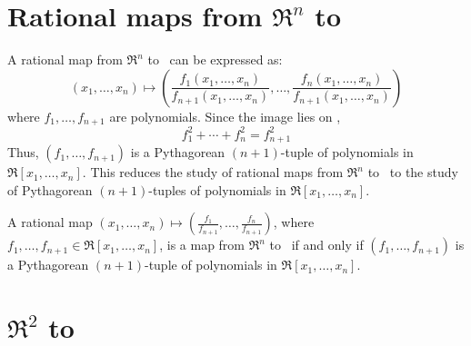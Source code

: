 \section{Rational maps from $\Re^{n}$ to }
\label{sec:setup}


A rational map from $\Re^n$ to \ can be expressed as:
\[
	(x_1,\ldots,x_n) \mapsto
	(\frac{f_1(x_1,\ldots,x_n)}{f_{n+1}(x_1,\ldots,x_n)}, \ldots,
	 \frac{f_n(x_1,\ldots,x_n)}{f_{n+1}(x_1,\ldots,x_n)})
\]
where $f_1,\ldots,f_{n+1}$ are polynomials.
Since the image lies on ,
\[
	f_1^2 + \cdots + f_n^2 = f_{n+1}^2
\]
Thus, $(f_1,\ldots,f_{n+1})$ is a Pythagorean $(n+1)$-tuple of polynomials in
$\Re[x_1,\ldots,x_n]$.
This reduces the study of rational maps from $\Re^{n}$ to \ 
to the study of Pythagorean $(n+1)$-tuples of polynomials in 
$\Re[x_1,\ldots,x_n]$.

\begin{lemma}
\label{lem:iffpyth}
A rational map 
$(x_1,\ldots,x_n) \mapsto (\frac{f_1}{f_{n+1}},\ldots,\frac{f_n}{f_{n+1}})$,
where $f_1,\ldots,f_{n+1} \in \Re[x_1,\ldots,x_n]$, is a map from $\Re^n$
to \Sn{n-1}\ if and only if $(f_1,\ldots,f_{n+1})$ is a Pythagorean
$(n+1)$-tuple of polynomials in $\Re[x_1,\ldots,x_n]$.
\end{lemma}

\section{$\Re^{2}$ to }
\label{sec:n2}

